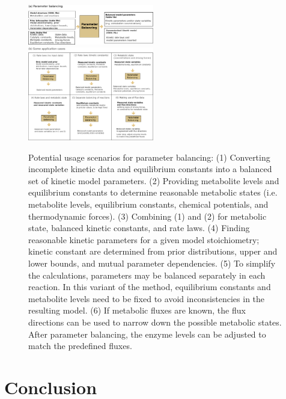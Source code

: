 \documentclass{bioinfo}
\begin{document}
\begin{figure}[t]
\begin{center}
 \includegraphics[width=0.49\textwidth]{figures/workflow.eps}\\[2mm]
 \includegraphics[width=0.49\textwidth]{figures/scenarios.eps}
 \caption[Parameter balancing]{Potential usage scenarios for parameter balancing: (1) Converting incomplete kinetic data and equilibrium constants into a balanced set of kinetic model parameters. (2) Providing metabolite levels and equilibrium constants to determine reasonable metabolic states (i.e. metabolite levels, equilibrium constants, chemical potentials, and thermodynamic forces). (3) Combining (1) and (2) for metabolic state, balanced kinetic constants, and rate laws. (4) Finding reasonable kinetic parameters for a given model stoichiometry; kinetic constant are determined from prior distributions, upper and lower bounds, and mutual parameter dependencies. (5) To simplify the calculations, parameters may be balanced separately in each reaction. In this variant of the method, equilibrium constants and metabolite levels need to be fixed to avoid inconsistencies in the resulting model. (6) If metabolic fluxes are known, the flux directions can be used to narrow down the possible metabolic states. After parameter balancing, the enzyme levels can be adjusted to match the predefined fluxes.
 \vspace{-5mm}
\label{ParameterBalancing}}
\end{center}
\end{figure}

\section{Conclusion}
\end{document}
